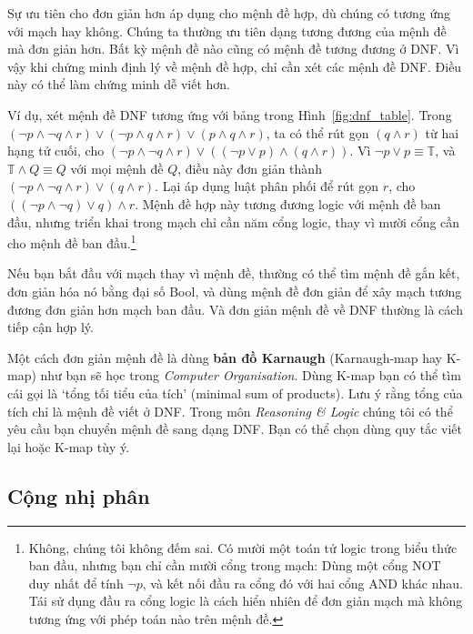 \begin{notebox}
Sự ưu tiên cho đơn giản hơn áp dụng cho mệnh đề hợp, dù chúng có tương ứng với mạch hay không. Chúng ta thường ưu tiên dạng tương đương của mệnh đề mà đơn giản hơn. Bất kỳ mệnh đề nào cũng có mệnh đề tương đương ở DNF. Vì vậy khi chứng minh định lý về mệnh đề hợp, chỉ cần xét các mệnh đề DNF. Điều này có thể làm chứng minh dễ viết hơn.
\end{notebox}

Ví dụ, xét mệnh đề DNF tương ứng với bảng trong Hình~\ref{fig:dnf_table}. Trong $(\lnot p \land \lnot q \land r) \lor (\lnot p \land q \land r) \lor (p \land q \land r)$, ta có thể rút gọn $(q \land r)$ từ hai hạng tử cuối, cho $(\lnot p \land \lnot q \land r) \lor ((\lnot p \lor p) \land (q \land r))$. Vì $\lnot p \lor p \equiv \mathbb{T}$, và $\mathbb{T} \land Q \equiv Q$ với mọi mệnh đề $Q$, điều này đơn giản thành $(\lnot p \land \lnot q \land r) \lor (q \land r)$. Lại áp dụng luật phân phối để rút gọn $r$, cho $((\lnot p \land \lnot q) \lor q) \land r$. Mệnh đề hợp này tương đương logic với mệnh đề ban đầu, nhưng triển khai trong mạch chỉ cần năm cổng logic, thay vì mười cổng cần cho mệnh đề ban đầu.\footnote{Không, chúng tôi không đếm sai. Có mười một toán tử logic trong biểu thức ban đầu, nhưng bạn chỉ cần mười cổng trong mạch: Dùng một cổng NOT duy nhất để tính $\lnot p$, và kết nối đầu ra cổng đó với hai cổng AND khác nhau. Tái sử dụng đầu ra cổng logic là cách hiển nhiên để đơn giản mạch mà không tương ứng với phép toán nào trên mệnh đề.}

Nếu bạn bắt đầu với mạch thay vì mệnh đề, thường có thể tìm mệnh đề gắn kết, đơn giản hóa nó bằng đại số Bool, và dùng mệnh đề đơn giản để xây mạch tương đương đơn giản hơn mạch ban đầu. Và đơn giản mệnh đề về DNF thường là cách tiếp cận hợp lý.

\begin{notebox}
Một cách đơn giản mệnh đề là dùng \textbf{bản đồ Karnaugh} (Karnaugh-map hay K-map) như bạn sẽ học trong \emph{Computer Organisation}. Dùng K-map bạn có thể tìm cái gọi là `tổng tối tiểu của tích' (minimal sum of products). Lưu ý rằng tổng của tích chỉ là mệnh đề viết ở DNF. Trong môn \emph{Reasoning \& Logic} chúng tôi có thể yêu cầu bạn chuyển mệnh đề sang dạng DNF. Bạn có thể chọn dùng quy tắc viết lại hoặc K-map tùy ý.
\end{notebox}

\subsection{Cộng nhị phân}

